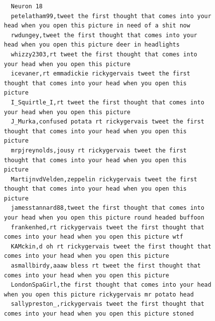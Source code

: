 \begin{figure}[htpb]
\begin{verbatim}
  Neuron 18
  petelatham99,tweet the first thought that comes into your head when you open this picture in need of a shit now
  rwdungey,tweet the first thought that comes into your head when you open this picture deer in headlights
  whizzy2303,rt tweet the first thought that comes into your head when you open this picture
  icevaner,rt emmadickie rickygervais tweet the first thought that comes into your head when you open this picture
  I_Squirtle_I,rt tweet the first thought that comes into your head when you open this picture
  J_Murka,confused potata rt rickygervais tweet the first thought that comes into your head when you open this picture
  mrpjreynolds,jousy rt rickygervais tweet the first thought that comes into your head when you open this picture
  MartijnvdVelden,zeppelin rickygervais tweet the first thought that comes into your head when you open this picture
  jamesstannard88,tweet the first thought that comes into your head when you open this picture round headed buffoon
  frankenhed,rt rickygervais tweet the first thought that comes into your head when you open this picture wtf
  KAMckin,d oh rt rickygervais tweet the first thought that comes into your head when you open this picture
  asmallbirdy,aaaw bless rt tweet the first thought that comes into your head when you open this picture
  LondonSpaGirl,the first thought that comes into your head when you open this picture rickygervais mr potato head
  sallypreston_,rickygervais tweet the first thought that comes into your head when you open this picture stoned


\end{verbatim}
\end{figure}
